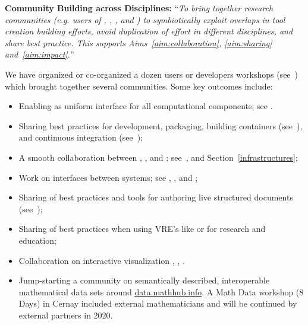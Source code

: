 \begin{compactenum}[\bf {Obj} 1\rm]
\item \label{objective:community}
  \textbf{Community Building across Disciplines:}
  ``\emph{To bring together research
    communities (e.g. users of \Jupyter, \Sage, \Singular, and \GAP) to
    symbiotically exploit overlaps in tool creation building efforts,
    avoid duplication of effort in different disciplines, and share best
    practice. This supports Aims~\ref{aim:collaboration},
    \ref{aim:sharing} and~\ref{aim:impact}.}''

  We have organized or co-organized a dozen users or developers
  workshops (see~) which brought
  together several communities. Some key outcomes include:
  \begin{itemize}
  \item Enabling \Jupyter as uniform interface for all computational components; see .
  \item Sharing best practices for development, packaging, building containers (see~), and continuous integration (see~);
  \item A smooth collaboration between \JupyterHub, \SMC, and \Simulagora; see~,  and Section~\ref{infrastructures};
  \item Work on interfaces between systems; see , , and ;
  \item Sharing of best practices and tools for authoring live structured documents (see~);
  \item Sharing of best practices when using VRE's like \cocalc or \Jupyter for research and education;
  \item Collaboration on interactive visualization , , .
  \item Jump-starting a community on semantically described, interoperable mathematical data sets around \url{data.mathhub.info}. A Math Data workshop (8 Days) in Cernay included external mathematicians and will be continued by external partners in 2020.
  \end{itemize}


\end{compactenum}
